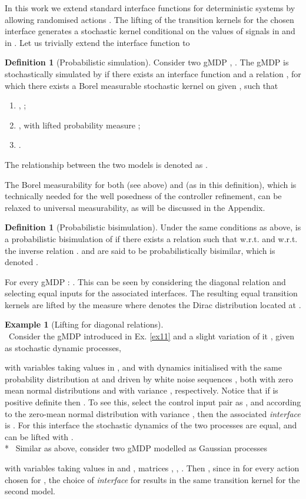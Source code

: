 \documentclass[letterpaper, 10 pt, conference]{amsart}
\theoremstyle{definition}
\newtheorem{defn}[definition]{Definition}
\theoremstyle{example}
\newtheorem{example}{Example}
\theoremstyle{remark}
\begin{document}
In this work we extend standard interface functions for deterministic systems by allowing randomised actions . 
The lifting of the transition kernels for the chosen interface generates a stochastic kernel  conditional on the values of signals in  and in .  
Let us trivially extend the interface function to  
\begin{defn}[Probabilistic simulation]\label{def:pbsim}
Consider two gMDP , .    
The gMDP  is stochastically simulated by  if there exists an interface function  and
a relation , for which there exists a Borel measurable stochastic kernel  on  given ,
such that { \setlength{\parskip}{-1pt}\setlength{\parsep}{0pt}
\begin{enumerate}
\item , ;  
\item ,   
 with lifted probability measure ;  
\item .
\end{enumerate} }\noindent The relationship between the two models is denoted as .  
\end{defn}  
The Borel measurability for both  (see above) and  (as in this definition), 
which is technically needed for the well posedness of the controller refinement, 
can be relaxed to universal measurability, as will be discussed in the Appendix.  
\begin{defn}[Probabilistic bisimulation]\label{def:pbbi}
Under the same conditions as above, 
 is a probabilistic bisimulation of  if there exists a   relation  such that  w.r.t.  and  w.r.t. the inverse relation .
 and  are said to be probabilistically bisimilar, 
which is denoted .   
\end{defn}
For every gMDP : 
.
This can be seen by considering the diagonal relation  and selecting equal inputs  for the associated interfaces. 
The resulting equal
 transition kernels  
  are lifted by the measure   where  denotes the Dirac distribution located at .  
\begin{example}[Lifting for diagonal relations]\label{ex:1} \mbox{ }\\ 
\noindent{}~Consider the gMDP  introduced in Ex. \ref{ex11} and a slight variation of it , given as stochastic dynamic processes, 

with variables  taking values in , 
and with dynamics initialised with the same probability distribution at  and driven by white noise sequences , 
both with zero mean normal distributions and with variance , respectively.  Notice that if  is positive definite then .  To see this, 
select the control input pair  as , 
and  according to the zero-mean normal distribution with variance , 
then the associated \emph{interface }is .  
For this interface the stochastic dynamics of the two processes are equal, 
and can be lifted with .\\*\noindent{}~
Similar as above, consider 
two gMDP modelled as Gaussian processes 
 
with variables  taking values in  and , matrices , , .  Then  , since in 
for every action  chosen for , the choice of \emph{interface}   for  results in the same transition kernel for the second model.   
 

\end{example}
\end{document}
